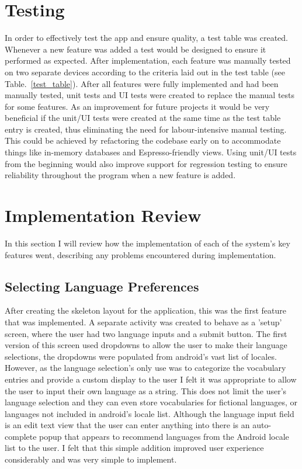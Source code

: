 \documentclass[runningheads]{llncs}
\begin{document}
	\section{Testing}
	In order to effectively test the app and ensure quality, a test table was created. Whenever a new feature was added a test would be designed to ensure it performed as expected. After implementation, each feature was manually tested on two separate devices according to the criteria laid out in the test table (see Table.~\ref{test_table}). After all features were fully implemented and had been manually tested, unit tests and UI tests were created to replace the manual tests for some features. As an improvement for future projects it would be very beneficial if the unit/UI tests were created at the same time as the test table entry is created, thus eliminating the need for labour-intensive manual testing. This could be achieved by refactoring the codebase early on to accommodate things like in-memory databases and Espresso-friendly views. Using unit/UI tests from the beginning would also improve support for regression testing to ensure reliability throughout the program when a new feature is added.
	
	\section{Implementation Review}
	In this section I will review how the implementation of each of the system's key features went, describing any problems encountered during implementation.
	\subsection{Selecting Language Preferences}
	After creating the skeleton layout for the application, this was the first feature that was implemented. A separate activity was created to behave as a 'setup' screen, where the user had two language inputs and a submit button. The first version of this screen used dropdowns to allow the user to make their language selections, the dropdowns were populated from android's vast list of locales. However, as the language selection's only use was to categorize the vocabulary entries and provide a custom display to the user I felt it was appropriate to allow the user to input their own language as a string. This does not limit the user's language selection and they can even store vocabularies for fictional languages, or languages not included in android's locale list. Although the language input field is an edit text view that the user can enter anything into there is an auto-complete popup that appears to recommend languages from the Android locale list to the user. I felt that this simple addition improved user experience considerably and was very simple to implement.
	
\end{document}
